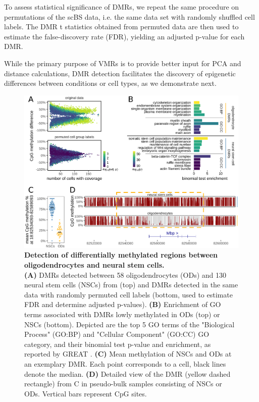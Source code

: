 \documentclass[twocolumn,10pt]{article}
\begin{document}
To assess statistical significance of DMRs, we repeat the same procedure on permutations of the scBS data, i.e. the same data set with randomly shuffled cell labels.
The DMR t statistics obtained from permuted data are then used to estimate the false-discovery rate (FDR), yielding an adjusted p-value for each DMR.

While the primary purpose of VMRs is to provide better input for PCA and distance calculations, DMR detection facilitates the discovery of epigenetic differences between conditions or cell types, as we demonstrate next.

\begin{figure}
	\begin{center}
		\includegraphics[width=.7\textwidth]{figures/Fig_DMRs.png}
	\end{center}
	\caption{\small \textbf{Detection of differentially methylated regions between oligodendrocytes and neural stem cells.}\\
		\textbf{(A)} DMRs detected between 58 oligodendrocytes (ODs) and 130 neural stem cells (NSCs) from \citet{kremer_scnmt} (top) and DMRs detected in the same data with randomly permuted cell labels (bottom, used to estimate FDR and determine adjusted p-values).
		\textbf{(B)} Enrichment of GO terms associated with DMRs lowly methylated in ODs (top) or NSCs (bottom).
		Depicted are the top 5 GO terms of the "Biological Process" (GO:BP) and "Cellular Component" (GO:CC) GO category, and their binomial test p-value and enrichment, as reported by GREAT \citep{mclean2010great}.
		\textbf{(C)} Mean methylation of NSCs and ODs at an exemplary DMR.
		Each point corresponds to a cell, black lines denote the median.
		\textbf{(D)} Detailed view of the DMR (yellow dashed rectangle) from C in pseudo-bulk samples consisting of NSCs or ODs.
		Vertical bars represent CpG sites.
	}
	\label{fig:dmr}
\end{figure}
\end{document}
